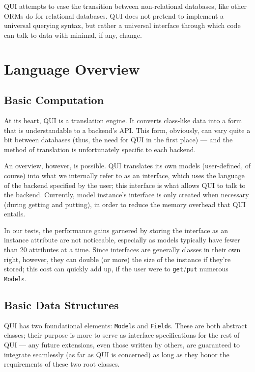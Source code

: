 \documentclass{article} %
\newcommand{\il}[1]{\mbox{\lstinline{#1}}}
\begin{document}
QUI attempts to ease the transition between non-relational databases, like other ORMs do for relational databases. QUI does not pretend
to implement a universal querying syntax, but rather a universal interface through which code can talk to data with minimal, if any, change.

\newpage
\section{Language Overview}
\subsection{Basic Computation}
At its heart, QUI is a translation engine. It converts class-like data into a form that is understandable to a backend's API. This form, obviously, can
vary quite a bit between databases (thus, the need for QUI in the first place) --- and the method of translation is unfortunately specific to each
backend.

An overview, however, is possible. QUI translates its own models (user-defined, of course) into what we internally refer to as an interface, which uses
the language of the backend specified by the user; this interface is what allows QUI to talk to the backend. Currently, model instance's interface is only 
created when necessary (during getting and putting), in order to reduce the memory overhead that QUI entails. 

In our tests, the performance gains garnered by storing the interface as an instance attribute are not noticeable, especially as models typically 
have fewer than 20 attributes at a time. Since interfaces are generally classes in their own right, however, they can double (or more) the size of 
the instance if they're stored; this cost can quickly add up, if the user were to \il{get}/\il{put} numerous \il{Model}s.

\subsection{Basic Data Structures}
QUI has two foundational elements: \il{Model}s and \il{Field}s. These are both abstract classes; their purpose is more to serve as interface specifications
for the rest of QUI --- any future extensions, even those written by others, are guaranteed to integrate seamlessly (as far as QUI is concerned)
as long as they honor the requirements of these two root classes. 
\end{document}
